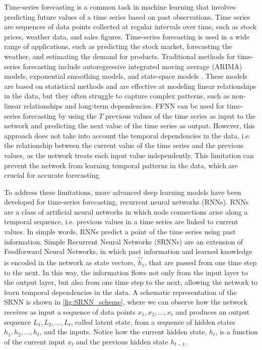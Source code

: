 Time-series forecasting is a common task in machine learning that involves
predicting future values of a time series based on past observations. Time
series are sequences of data points collected at regular intervals over time,
such as stock prices, weather data, and sales figures. Time-series forecasting
is used in a wide range of applications, such as predicting the stock market,
forecasting the weather, and estimating the demand for products. Traditional
methods for time-series forecasting include autoregressive integrated moving
average (ARIMA) models, exponential smoothing models, and state-space models
\cite{Hyndman2018}. These models are based on statistical methods and are
effective at modeling linear relationships in the data, but they often struggle
to capture complex patterns, such as non-linear relationships and long-term
dependencies. FFNN can be used for time-series forecasting by using the $T$
previous values of the time series as input to the network and predicting the
next value of the time series as output. However, this approach does not take
into account the temporal dependencies in the data, i.e. the relationship
between the current value of the time series and the previous values, as the
network treats each input value independently. This limitation can prevent the
network from learning temporal patterns in the data, which are crucial for
accurate forecasting.

To address these limitations, more advanced deep learning models have been
developed for time-series forecasting, recurrent neural networks (RNNs). RNNs
are a class of artificial neural networks in which node connections arise along
a temporal sequence, i.e. previous values in a time series are linked to
current values. In simple words, RNNs predict a point of the time series using
past information. Simple Recurrent Neural Networks (SRNNs) are an extension of
Feedforward Neural Networks, in which past information and learned knowledge is
encoded in the network as state vectors, $\vec{h}_t$, that are passed from one
time step to the next. In this way, the information flows not only from the
input layer to the output layer, but also from one time step to the next,
allowing the network to learn temporal dependencies in the data. A schematic
representation of the SRNN is shown in \cref{fig:SRNN_scheme}, where we can
observe how the network receives as input a sequence of data points $x_1, x_2,
  \ldots, x_t$ and produces an output sequence $L_1, L_2, \ldots, L_t$, called
latent state, from a sequence of hidden states $h_1, h_2, \ldots, h_t$, and the
inputs. Notice how the current hidden state, $h_t$, is a function of the
current input $x_{t}$ and the previous hidden state $h_{t-1}$.

